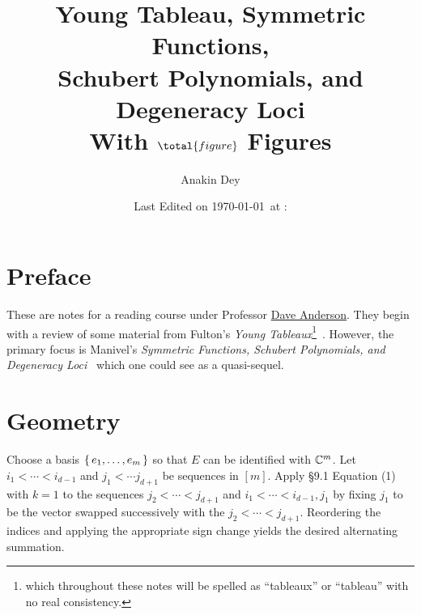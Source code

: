 \documentclass[letterpaper, 11pt, oneside]{book}
\title{\vspace{-100pt} {\Huge Young Tableau, Symmetric Functions, \protect\\ Schubert Polynomials, and Degeneracy Loci} \\ {\small With $\total{figure}$ Figures}}
\author{\Large Anakin Dey}
\date{\small Last Edited on \today\ at \DTMfetchhour{now}:\DTMfetchminute{now}}
\newcommand{\CoverName}{Cover}
\begin{document}
\frontmatter
\renewcommand{\thepage}{\CoverName}
\maketitle


\tableofcontents
\clearpage


%

\chapter*{Preface}

These are notes for a reading course under Professor \href{https://people.math.osu.edu/anderson.2804/index.html}{Dave Anderson}.
They begin with a review of some material from Fulton's \emph{Young Tableaux}\footnote{which throughout these notes will be spelled as ``tableaux'' or ``tableau'' with no real consistency.}~\cite{book:YT}.
However, the primary focus is Manivel's \emph{Symmetric Functions, Schubert Polynomials, and Degeneracy Loci}~\cite{book:ManivelSFSPDL} which one could see as a quasi-sequel.

\mainmatter

\chapter{\cite{book:YT} Geometry}

\begin{sol}\label{ex:YT_9.1.1}
  Choose a basis $\set{e_{1}, \ldots, e_{m}}$ so that $E$ can be identified with $\mathbb{C}^{m}$.
  Let $i_{1} < \cdots < i_{d - 1}$ and $j_{1} < \cdots j_{d + 1}$ be sequences in $[m]$.
  Apply \S 9.1 Equation (1) with $k = 1$ to the sequences $j_{2} < \cdots < j_{d + 1}$ and $i_{1} < \cdots < i_{d - 1}, j_{1}$ by fixing $j_{1}$ to be the vector swapped successively with the $j_{2} < \cdots < j_{d + 1}$.
  Reordering the indices and applying the appropriate sign change yields the desired alternating summation.
\end{sol}
\end{document}
